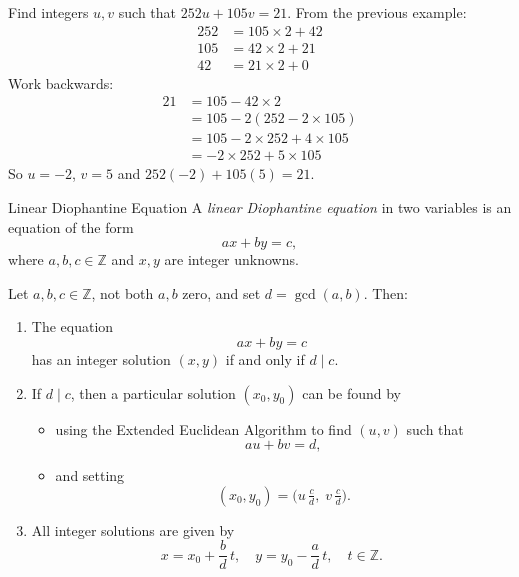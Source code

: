 \begin{example}
Find integers $u, v$ such that $252u + 105v = 21$.
From the previous example:
\begin{align*}
  252 &= 105 \times 2 + 42 \\[-1ex]
  105 &= 42 \times 2 + 21 \\[-1ex]
  42 &= 21 \times 2 + 0
\end{align*}
Work backwards:
\begin{align*}
  21 &= 105 - 42 \times 2 \\
     &= 105 - 2(252 - 2 \times 105) \\
     &= 105 - 2 \times 252 + 4 \times 105 \\
     &= -2 \times 252 + 5 \times 105
\end{align*}
So $u = -2$, $v = 5$ and $252(-2) + 105(5) = 21$.
\end{example}


\begin{define}{Linear Diophantine Equation}
  A \emph{linear Diophantine equation} in two variables is an equation of the form
  \[
    a x + b y = c,
  \]
  where $a,b,c\in\mathbb Z$ and $x,y$ are integer unknowns.
\end{define}


\begin{theorem}
Let $a,b,c\in\mathbb Z$, not both $a,b$ zero, and set $d=\gcd(a,b)$.  Then:
\begin{enumerate}[label=\textup{(\arabic*)}]
  \item The equation
    \[
      a x + b y = c
    \]
    has an integer solution $(x,y)$ if and only if $d\mid c$.
  \item If $d\mid c$, then a particular solution $(x_0,y_0)$ can be found by
    \begin{itemize}[nosep]
      \item using the Extended Euclidean Algorithm to find $(u,v)$ such that
        \[a u + b v = d,\]
      \item and setting
        \[(x_0,y_0) = \bigl(u\,\tfrac{c}{d},\;v\,\tfrac{c}{d}\bigr).\]
    \end{itemize}
  \item All integer solutions are given by
    \[
      x = x_0 + \frac{b}{d}\,t,
      \quad
      y = y_0 - \frac{a}{d}\,t,
      \quad t\in\mathbb Z.
    \]
\end{enumerate}
\end{theorem}

